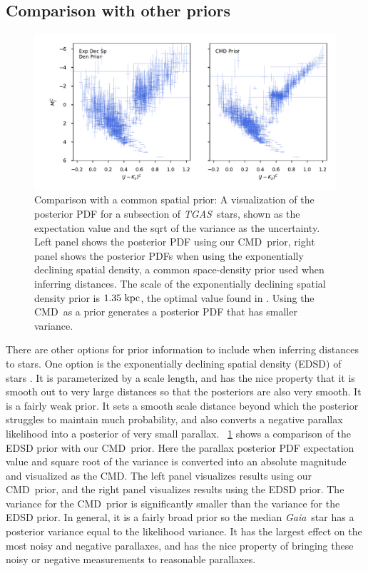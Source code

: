 \documentclass[modern]{aastex61}
\newcommand{\acronym}[1]{{\small{#1}}}
\newcommand{\project}[1]{\textsl{#1}}
\newcommand{\tgas}{\project{\acronym{TGAS}}}
\newcommand{\gaia}{\project{Gaia}}
\newcommand{\cmd}{\acronym{CMD}}
\begin{document}
\subsection{Comparison with other priors}
\begin{figure}
\centering
  \includegraphics[width=\textwidth]{comparePrior.pdf}
\caption{Comparison with a common spatial prior: A visualization of the posterior PDF for a subsection of \tgas\ stars, shown as the expectation value and the sqrt of the variance as the uncertainty. Left panel shows the posterior PDF using our \cmd\ prior, right panel shows the posterior PDFs when using the exponentially declining spatial density, a common space-density prior used when inferring distances. The scale of the exponentially declining spatial density prior is $1.35~{\rm kpc}$, the optimal value found in \cite{astraatmadja16a}. Using the \cmd\ as a prior generates a posterior PDF that has smaller variance.}
\label{fig:comparePrior}
\end{figure}

There are other options for prior information to include when inferring distances to stars.
One option is the exponentially declining spatial density (EDSD) of stars \citep{astraatmadja16a}.
It is parameterized by a scale length, and has the nice property that it is smooth out to very large distances so that the posteriors are also very smooth.
It is a fairly weak prior.
It sets a smooth scale distance beyond which the posterior struggles to maintain much probability, and also converts a negative parallax likelihood into a posterior of very small parallax.
\figurename~\ref{fig:comparePrior} shows a comparison of the EDSD prior with our \cmd\ prior.
Here the parallax posterior PDF expectation value and square root of the variance is converted into an absolute magnitude and visualized as the \cmd.
The left panel visualizes results using our \cmd\ prior, and the right panel visualizes results using the EDSD prior.
The variance for the \cmd\ prior is significantly smaller than the variance for the EDSD prior.
In general, it is a fairly broad prior so the median \gaia\ star has a posterior variance equal to the likelihood variance.
It has the largest effect on the most noisy and negative parallaxes, and has the nice property of bringing these noisy or negative measurements to reasonable parallaxes.
\end{document}
